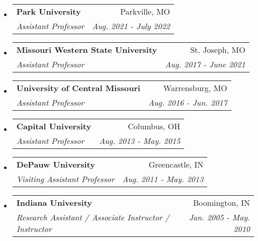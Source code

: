 \documentclass[letterpaper,11pt]{article}
\makeatletter
\newcommand{\resitem}[1]{\item #1 \vspace{-2pt}}
\newcommand{\ressubheading}[4]{
\begin{tabular*}{6.5in}{l@{\cftdotfill{\cftsecdotsep}\extracolsep{\fill}}r}
		\textbf{#1} & #2 \\
		\textit{#3} & \textit{#4} \\
\end{tabular*}\vspace{-6pt}}
\makeatother
\begin{document}
\begin{itemize}
\item
	\ressubheading{Park University}{Parkville, MO}{Assistant Professor}{Aug. 2021 - July 2022}
\item
	\ressubheading{Missouri Western State University}{St. Joseph, MO}{Assistant Professor}{Aug. 2017 - June 2021}
\item
	\ressubheading{University of Central Missouri}{Warrensburg, MO}{Assistant Professor}{Aug. 2016 - Jun. 2017}
\item
	\ressubheading{Capital University}{Columbus, OH}{Assistant Professor}{Aug. 2013 - May. 2015}
\item
	\ressubheading{DePauw University}{Greencastle, IN}{Visiting Assistant Professor}{Aug. 2011 - May. 2013}
\item
	\ressubheading{Indiana University}{Boomington, IN}{Research Assistant / Associate Instructor / Instructor }{Jan. 2005 - May. 2010}

\end{itemize}
\end{document}
